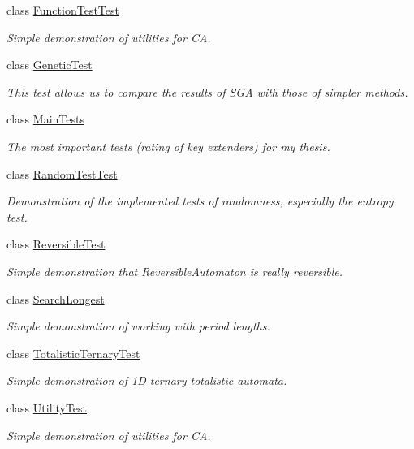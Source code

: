 \begin{DoxyCompactItemize}
class \hyperlink{class_testing_1_1_function_test_test}{Function\+Test\+Test}
\begin{DoxyCompactList}\small\item\em Simple demonstration of utilities for C\+A. \end{DoxyCompactList}\item 
class \hyperlink{class_testing_1_1_genetic_test}{Genetic\+Test}
\begin{DoxyCompactList}\small\item\em This test allows us to compare the results of S\+G\+A with those of simpler methods. \end{DoxyCompactList}\item 
class \hyperlink{class_testing_1_1_main_tests}{Main\+Tests}
\begin{DoxyCompactList}\small\item\em The most important tests (rating of key extenders) for my thesis. \end{DoxyCompactList}\item 
class \hyperlink{class_testing_1_1_random_test_test}{Random\+Test\+Test}
\begin{DoxyCompactList}\small\item\em Demonstration of the implemented tests of randomness, especially the entropy test. \end{DoxyCompactList}\item 
class \hyperlink{class_testing_1_1_reversible_test}{Reversible\+Test}
\begin{DoxyCompactList}\small\item\em Simple demonstration that {\ttfamily Reversible\+Automaton} is really reversible. \end{DoxyCompactList}\item 
class \hyperlink{class_testing_1_1_search_longest}{Search\+Longest}
\begin{DoxyCompactList}\small\item\em Simple demonstration of working with period lengths. \end{DoxyCompactList}\item 
class \hyperlink{class_testing_1_1_totalistic_ternary_test}{Totalistic\+Ternary\+Test}
\begin{DoxyCompactList}\small\item\em Simple demonstration of 1\+D ternary totalistic automata. \end{DoxyCompactList}\item 
class \hyperlink{class_testing_1_1_utility_test}{Utility\+Test}
\begin{DoxyCompactList}\small\item\em Simple demonstration of utilities for C\+A. \end{DoxyCompactList}\end{DoxyCompactItemize}
